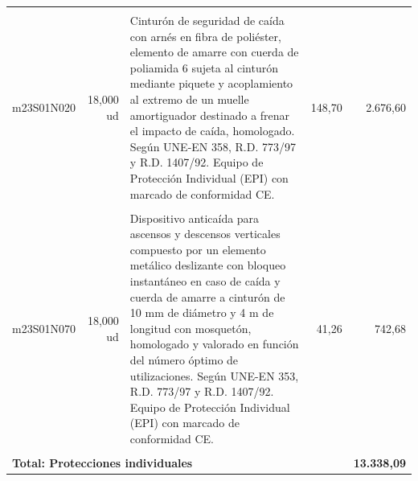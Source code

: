 \documentclass{book}%
\begin{document}
\begin{longtable}{lrlrr}
&&&&\\%
m23S01N020&    18,000 ud&\multicolumn{1}{p{5cm}}{Cinturón de seguridad de caída con arnés en fibra de poliéster, elemento de amarre con cuerda de poliamida 6 sujeta al cinturón mediante piquete y acoplamiento al extremo de un muelle amortiguador destinado a frenar el impacto de caída, homologado. Según UNE{-}EN 358, R.D. 773/97 y R.D. 1407/92. Equipo de Protección Individual (EPI) con marcado de conformidad CE.}&    148,70&2.676,60\\%
&&&&\\%
m23S01N070&    18,000 ud&\multicolumn{1}{p{5cm}}{Dispositivo anticaída para ascensos y descensos verticales compuesto por un elemento metálico deslizante con bloqueo instantáneo en caso de caída y cuerda de amarre a cinturón de 10 mm de diámetro y 4 m de longitud con mosquetón, homologado y valorado en función del número óptimo de utilizaciones. Según UNE{-}EN 353, R.D. 773/97 y R.D. 1407/92. Equipo de Protección Individual (EPI) con marcado de conformidad CE.}&     41,26&742,68\\%
&&&&\\%
\multicolumn{4}{p{8cm}}{\textbf{Total: Protecciones individuales}}&\textbf{13.338,09}\\%
\end{longtable}%
\normalsize

%
\end{document}
